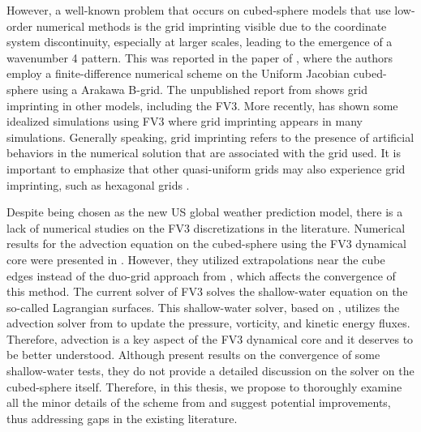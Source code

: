 However, a well-known problem that occurs on cubed-sphere models that use low-order numerical methods
is the grid imprinting visible due to the coordinate system discontinuity, 
especially at larger scales, leading to the emergence of a wavenumber 4 pattern.
This was reported in the paper of \citet{rancic:2017}, where the authors employ a 
finite-difference numerical scheme on the Uniform Jacobian cubed-sphere using a Arakawa B-grid.
The unpublished report from \citet{whitaker:2015} shows grid imprinting in other models, including 
the FV3.
More recently, \citet{mouallem:2023} has shown some idealized simulations using FV3 where grid imprinting appears in many simulations.
Generally speaking, grid imprinting refers to the presence of artificial behaviors in the numerical solution that are associated with the grid used.
It is important to emphasize that other quasi-uniform grids may also experience grid imprinting, such as hexagonal grids \citep{weller:2012, peixoto:2013, peixoto:2016}.

Despite being chosen as the new US global weather prediction model, there is a lack of numerical studies on the FV3 discretizations in the literature.
Numerical results for the advection equation on the cubed-sphere using the FV3 dynamical core were presented in \citet{putman:2007}.
However, they utilized extrapolations near the cube edges instead of the duo-grid approach from \citet{mouallem:2023}, which affects the convergence of this method.
The current solver of FV3 solves the shallow-water equation on the so-called Lagrangian surfaces.
This shallow-water solver, based on \citet{lin:1997}, 
utilizes the advection solver from \citet{putman:2007} to update the pressure, vorticity, and kinetic energy fluxes.
Therefore, advection is a key aspect of the FV3 dynamical core and it deserves to be better understood.
Although \citet{mouallem:2023} present results on the convergence of some shallow-water tests,
they do not provide a detailed discussion on the solver on the cubed-sphere itself.
Therefore, in this thesis, we propose to thoroughly examine all the minor details of the scheme from \citet{putman:2007} and suggest potential improvements,
thus addressing gaps in the existing literature.


